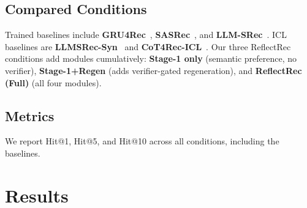 \documentclass[11pt]{article}
\begin{document}
\subsection{Compared Conditions}

Trained baselines include \textbf{GRU4Rec}~\citep{hidasi2016gru4rec}, 
\textbf{SASRec}~\citep{kang2018sasrec}, and 
\textbf{LLM-SRec}~\citep{kim2025lost}. ICL baselines are 
\textbf{LLMSRec-Syn}~\citep{wang2024llmsrecsyn} and 
\textbf{CoT4Rec-ICL}~\citep{cot4rec2025}. Our three ReflectRec conditions add 
modules cumulatively: \textbf{Stage-1 only} (semantic preference, 
no verifier), \textbf{Stage-1+Regen} (adds verifier-gated 
regeneration), and \textbf{ReflectRec (Full)} (all four modules).


\subsection{Metrics}
We report Hit@1, Hit@5, and Hit@10 across all conditions, including the baselines.

\section{Results}
\label{sec:results}
\end{document}
